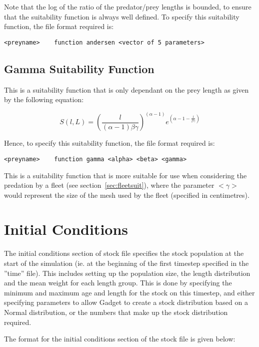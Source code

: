 \documentclass[10pt,twoside]{book}
\begin{document}
Note that the log of the ratio of the predator/prey lengths is bounded, to ensure that the suitability function is always well defined.  To specify this suitability function, the file format required is:

{\small\begin{verbatim}
<preyname>    function andersen <vector of 5 parameters>
\end{verbatim}}

\subsection{Gamma Suitability Function}
This is a suitability function that is only dependant on the prey length as given by the following equation:

\begin{equation}\label{eq:gammasuit}
S(l, L) = \left(\frac{l}{(\alpha - 1) \beta\gamma}\right) ^ {(\alpha - 1)}e ^ {(\alpha - 1 - \frac{l}{\beta\gamma})}
\end{equation}

Hence, to specify this suitability function, the file format required is:

{\small\begin{verbatim}
<preyname>    function gamma <alpha> <beta> <gamma>
\end{verbatim}}

This is a suitability function that is more suitable for use when considering the predation by a fleet (see section~\ref{sec:fleetsuit}), where the parameter $<\gamma>$ would represent the size of the mesh used by the fleet (specified in centimetres).

\section{Initial Conditions}\label{sec:stockinitial}
The initial conditions section of stock file specifies the stock population at the start of the simulation (ie. at the beginning of the first timestep specified in the ''time'' file).  This includes setting up the population size, the length distribution and the mean weight for each length group.  This is done by specifying the minimum and maximum age and length for the stock on this timestep, and either specifying parameters to allow Gadget to create a stock distribution based on a Normal distribution, or the numbers that make up the stock distribution required.

\bigskip
The format for the initial conditions section of the stock file is given below:
\end{document}
